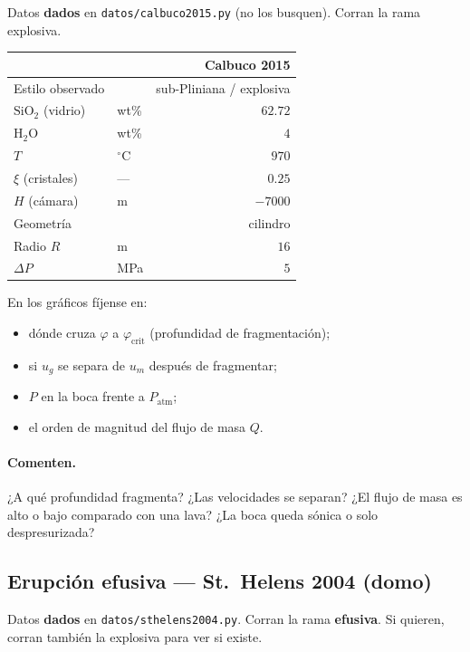 \documentclass[11pt,a4paper]{article}
\begin{document}
Datos \textbf{dados} en \texttt{datos/calbuco2015.py} (no los busquen).
Corran la rama explosiva.

\begin{center}
\small
\begin{tabular}{@{}llr@{}}
\toprule
& & Calbuco 2015 \\
\midrule
Estilo observado & & sub-Pliniana / explosiva \\
$\mathrm{SiO}_2$ (vidrio) & wt\% & $62.72$ \\
$\mathrm{H}_2\mathrm{O}$ & wt\% & $4$ \\
$T$ & $^\circ\mathrm{C}$ & $970$ \\
$\xi$ (cristales) & --- & $0.25$ \\
$H$ (cámara) & m & $-7000$ \\
Geometría & & cilindro \\
Radio $R$ & m & $16$ \\
$\Delta P$ & MPa & $5$ \\
\bottomrule
\end{tabular}
\end{center}

En los gráficos fíjense en:
\begin{itemize}
  \item dónde cruza $\varphi$ a $\varphi_{\mathrm{crit}}$
        (profundidad de fragmentación);
  \item si $u_g$ se separa de $u_m$ después de fragmentar;
  \item $P$ en la boca frente a $P_{\mathrm{atm}}$;
  \item el orden de magnitud del flujo de masa $Q$.
\end{itemize}

\paragraph{Comenten.}
¿A qué profundidad fragmenta? ¿Las velocidades se separan?
¿El flujo de masa es alto o bajo comparado con una lava?
¿La boca queda sónica o solo despresurizada?

\subsection{Erupción efusiva --- St.\ Helens 2004 (domo)}

Datos \textbf{dados} en \texttt{datos/sthelens2004.py}.
Corran la rama \textbf{efusiva}. Si quieren, corran también la explosiva
para ver si existe.
\end{document}
